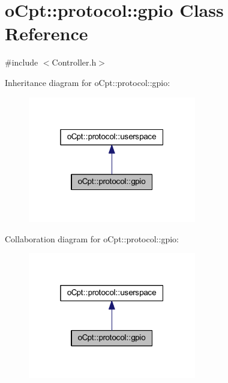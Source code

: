 \hypertarget{classo_cpt_1_1protocol_1_1gpio}{}\section{o\+Cpt\+:\+:protocol\+:\+:gpio Class Reference}
\label{classo_cpt_1_1protocol_1_1gpio}


{\ttfamily \#include $<$Controller.\+h$>$}



Inheritance diagram for o\+Cpt\+:\+:protocol\+:\+:gpio\+:\nopagebreak
\begin{figure}[H]
\begin{center}
\leavevmode
\includegraphics[width=208pt]{classo_cpt_1_1protocol_1_1gpio__inherit__graph}
\end{center}
\end{figure}


Collaboration diagram for o\+Cpt\+:\+:protocol\+:\+:gpio\+:\nopagebreak
\begin{figure}[H]
\begin{center}
\leavevmode
\includegraphics[width=208pt]{classo_cpt_1_1protocol_1_1gpio__coll__graph}
\end{center}
\end{figure}
